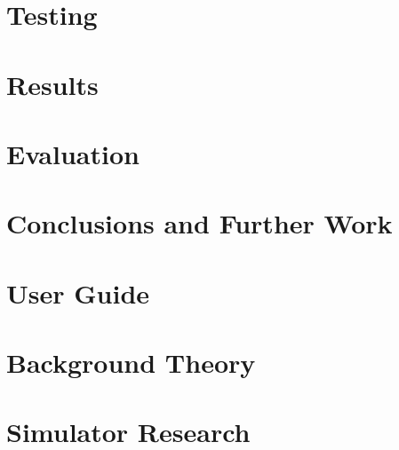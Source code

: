 \documentclass[11pt,a4paper,twoside,openright]{report}
\begin{document}
\chapter{Testing}
%


\chapter{Results}




\chapter{Evaluation}
%


\chapter{Conclusions and Further Work}
%


\chapter{User Guide}



\newpage


\begin{appendices}
\appendix
\chapter{Background Theory}

\chapter{Simulator Research}



\end{appendices}
\end{document}

